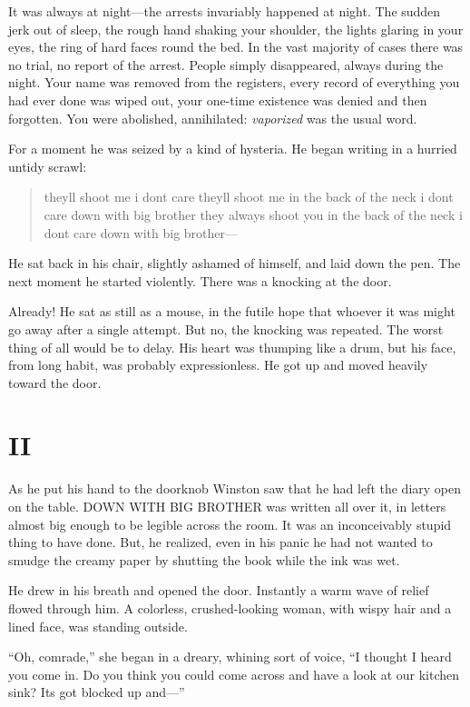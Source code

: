 It was always at night---the arrests invariably happened at night. The
sudden jerk out of sleep, the rough hand shaking your shoulder, the
lights glaring in your eyes, the ring of hard faces round the bed. In
the vast majority of cases there was no trial, no report of the arrest.
People simply disappeared, always during the night. Your name was
removed from the registers, every record of everything you had ever done
was wiped out, your one-time existence was denied and then forgotten.
You were abolished, annihilated: \emph{vaporized} was the usual word.

For a moment he was seized by a kind of hysteria. He began writing in a
hurried untidy scrawl:

\begin{quotation}
theyll shoot me i dont care theyll shoot me in the back of the
neck i dont care down with big brother they always shoot you in the back
of the neck i dont care down with big brother---
\end{quotation}

He sat back in his chair, slightly ashamed of himself, and laid down the
pen. The next moment he started violently. There was a knocking at the
door.

Already! He sat as still as a mouse, in the futile hope that whoever it
was might go away after a single attempt. But no, the knocking was
repeated. The worst thing of all would be to delay. His heart was
thumping like a drum, but his face, from long habit, was probably
expressionless. He got up and moved heavily toward the door.


\section{II}\label{ii}

As he put his hand to the doorknob Winston saw that he had left the
diary open on the table. DOWN WITH BIG BROTHER was written all over it,
in letters almost big enough to be legible across the room. It was an
inconceivably stupid thing to have done. But, he realized, even in his
panic he had not wanted to smudge the creamy paper by shutting the book
while the ink was wet.

He drew in his breath and opened the door. Instantly a warm wave of
relief flowed through him. A colorless, crushed-looking woman, with
wispy hair and a lined face, was standing outside.

``Oh, comrade,'' she began in a dreary, whining sort of voice, ``I thought
I heard you come in. Do you think you could come across and have a look
at our kitchen sink? It\textquotesingle s got blocked up and---''

